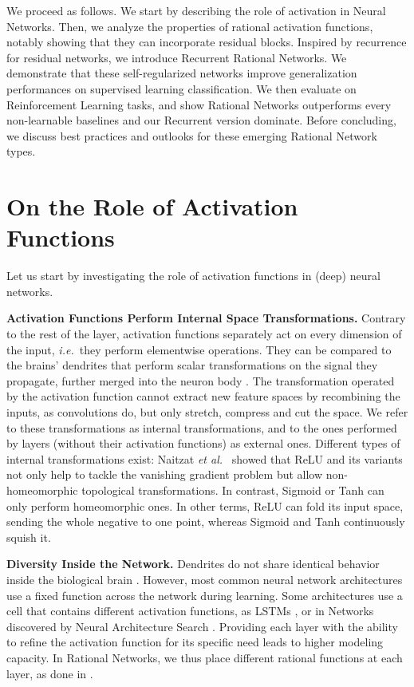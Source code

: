 \documentclass{article}
\newcommand{\ie}{\emph{i.e.}~}
\newcommand{\etal}{\emph{et al.}~}
\begin{document}
We proceed as follows. We start by describing the role of activation in Neural Networks. Then, we analyze the properties of rational activation functions, notably showing that they can incorporate residual blocks. Inspired by recurrence for residual networks, we introduce Recurrent Rational Networks. We demonstrate that these self-regularized networks improve generalization performances on supervised learning classification. We then evaluate on Reinforcement Learning tasks, and show Rational Networks outperforms every non-learnable baselines and our Recurrent version dominate. 
Before concluding, we discuss best practices and outlooks for these emerging Rational Network types.


\section{On the Role of Activation Functions}
Let us start by investigating the role of activation functions in (deep) neural networks.

\textbf{Activation Functions Perform Internal Space Transformations.}
Contrary to the rest of the layer, activation functions separately act on every dimension of the input, \ie they perform elementwise operations. They can be compared to the brains' dendrites that perform scalar transformations on the signal they propagate, further merged into the neuron body \cite{li2020power}. The transformation operated by the activation function cannot extract new feature spaces by recombining the inputs, as convolutions do, but only stretch, compress and cut the space. We refer to these transformations as internal transformations, and to the ones performed by layers (without their activation functions) as external ones. 
Different types of internal transformations exist: Naitzat \etal{} showed that ReLU and its variants not only help to tackle the vanishing gradient problem but allow non-homeomorphic topological transformations. In contrast, Sigmoid or Tanh can only perform homeomorphic ones. In other terms, ReLU can fold its input space, sending the whole negative to one point, whereas Sigmoid and Tanh continuously squish it.

\textbf{Diversity Inside the Network.}
Dendrites do not share identical behavior inside the biological brain \cite{tavosanis2012dendritic}. However, most common neural network architectures use a fixed function across the network during learning. Some architectures use a cell that contains different activation functions, as LSTMs \cite{GreffSKSS15}, or in Networks discovered by Neural Architecture Search \cite{liu2018progressive}. Providing each layer with the ability to refine the activation function for its specific need leads to higher modeling capacity. In Rational Networks, we thus place different rational functions at each layer, as done in \cite{molina2019pad}.
\end{document}
